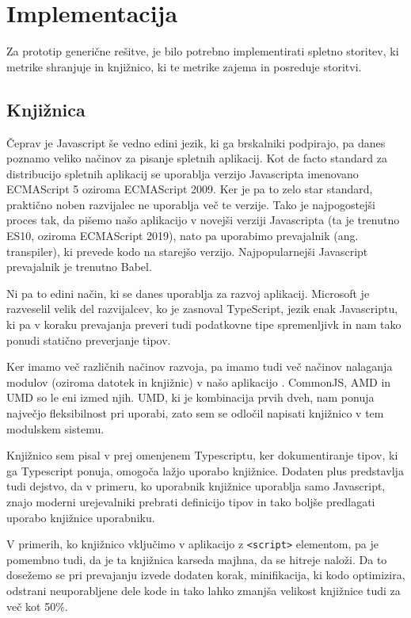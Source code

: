 \documentclass[a4paper, 12pt]{book}
\begin{document}
\section{Implementacija}
\label{ch3:sec2}

Za prototip generične rešitve, je bilo potrebno implementirati spletno storitev, ki metrike shranjuje in knjižnico, ki te metrike zajema in posreduje storitvi.

\subsection{Knjižnica}
\label{ch3:sec2:sub1}

Čeprav je Javascript še vedno edini jezik, ki ga brskalniki podpirajo, pa danes poznamo veliko načinov za pisanje spletnih aplikacij. Kot de facto standard za distribucijo spletnih aplikacij se uporablja verzijo Javascripta imenovano ECMAScript 5 oziroma ECMAScript 2009. Ker je pa to zelo star standard, praktično noben razvijalec ne uporablja več te verzije. Tako je najpogostejši proces tak, da pišemo našo aplikacijo v novejši verziji Javascripta (ta je trenutno ES10, oziroma ECMAScript 2019), nato pa uporabimo prevajalnik (ang. transpiler), ki prevede kodo na starejšo verzijo. Najpopularnejši Javascript prevajalnik je trenutno Babel.

Ni pa to edini način, ki se danes uporablja za razvoj aplikacij. Microsoft je razveselil velik del razvijalcev, ko je zasnoval TypeScript, jezik enak Javascriptu, ki pa v koraku prevajanja preveri tudi podatkovne tipe spremenljivk in nam tako ponudi statično preverjanje tipov.

Ker imamo več različnih načinov razvoja, pa imamo tudi več načinov nalaganja modulov (oziroma datotek in knjižnic) v našo aplikacijo \cite{js_modules}. CommonJS, AMD in UMD so le eni izmed njih. UMD, ki je kombinacija prvih dveh, nam ponuja največjo fleksibilnost pri uporabi, zato sem se odločil napisati knjižnico v tem modulskem sistemu.

Knjižnico sem pisal v prej omenjenem Typescriptu, ker dokumentiranje tipov, ki ga Typescript ponuja, omogoča lažjo uporabo knjižnice. Dodaten plus predstavlja tudi dejstvo, da v primeru, ko  uporabnik knjižnice uporablja samo Javascript, znajo moderni urejevalniki prebrati definicijo tipov in tako boljše predlagati uporabo knjižnice uporabniku.

V primerih, ko knjižnico vključimo v aplikacijo z \verb|<script>| elementom, pa je pomembno tudi, da je ta knjižnica karseda majhna, da se hitreje naloži. Da to dosežemo se pri prevajanju izvede dodaten korak, minifikacija, ki kodo optimizira, odstrani neuporabljene dele kode in tako lahko zmanjša velikost knjižnice tudi za več kot 50\%.
\end{document}
